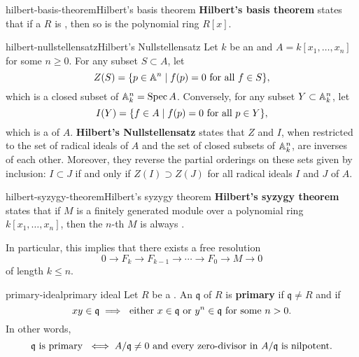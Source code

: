 \begin{topic}{hilbert-basis-theorem}{Hilbert's basis theorem}
    \textbf{Hilbert's basis theorem} states that if a  $R$ is , then so is the polynomial ring $R[x]$.
\end{topic}

\begin{topic}{hilbert-nullstellensatz}{Hilbert's Nullstellensatz}
    Let $k$ be an  and $A = k[x_1, \ldots, x_n]$ for some $n \ge 0$. For any subset $S \subset A$, let
    \[ Z(S) = \{ p \in \AA^n \mid f(p) = 0 \textup{ for all } f \in S \} , \]
    which is a closed subset of $\AA^n_k = \Spec A$. Conversely, for any subset $Y \subset \AA^n_k$, let
    \[ I(Y) = \{ f \in A \mid f(p) = 0 \textup{ for all } p \in Y \} , \]
    which is a  of $A$.
    \textbf{Hilbert's Nullstellensatz} states that $Z$ and $I$, when restricted to the set of radical ideals of $A$ and the set of closed subsets of $\AA^n_k$, are inverses of each other. Moreover, they reverse the partial orderings on these sets given by inclusion: $I \subset J$ if and only if $Z(I) \supset Z(J)$ for all radical ideals $I$ and $J$ of $A$.
\end{topic}

\begin{topic}{hilbert-syzygy-theorem}{Hilbert's syzygy theorem}
    \textbf{Hilbert's syzygy theorem} states that if $M$ is a finitely generated module over a polynomial ring $k[x_1, \ldots, x_n]$, then the $n$-th  $M$ is always .
    
    In particular, this implies that there exists a free resolution
    \[ 0 \to F_k \to F_{k - 1} \to \cdots \to F_0 \to M \to 0 \]
    of length $k \le n$.
\end{topic}

\begin{topic}{primary-ideal}{primary ideal}
    Let $R$ be a . An  $\mathfrak{q}$ of $R$ is \textbf{primary} if $\mathfrak{q} \ne R$ and if
    \[ xy \in \mathfrak{q} \implies \textup{ either } x \in \mathfrak{q} \textup{ or } y^n \in \mathfrak{q} \textup{ for some } n > 0 . \]
    In other words,
    \[ \mathfrak{q} \textup{ is primary } \iff A / \mathfrak{q} \ne 0 \textup{ and every zero-divisor in } A / \mathfrak{q} \textup{ is nilpotent} . \]
\end{topic}

